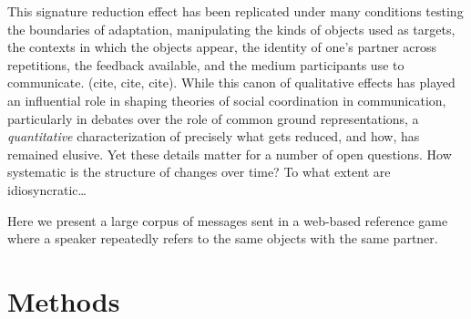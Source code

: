 \documentclass[alpha-refs]{wiley-article}
\begin{document}
This signature reduction effect has been replicated under many conditions testing the boundaries of adaptation, manipulating the kinds of objects used as targets, the contexts in which the objects appear, the identity of one's partner across repetitions, the feedback available, and the medium participants use to communicate. (cite, cite, cite). 
While this canon of qualitative effects has played an influential role in shaping theories of social coordination in communication, particularly in debates over the role of common ground representations, a \emph{quantitative} characterization of precisely what gets reduced, and how, has remained elusive. 
Yet these details matter for a number of open questions. 
How systematic is the structure of changes over time?
To what extent are idiosyncratic\dots
{}

Here we present a large corpus of messages sent in a web-based reference game where a speaker repeatedly refers to the same objects with the same partner. 


\section{Methods}
\end{document}
